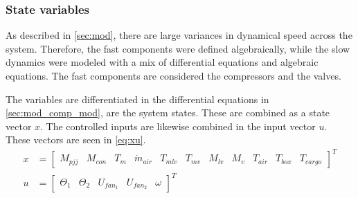 \newpage

\subsubsection{State variables}
As described in \cref{sec:mod}, there are large variances in dynamical speed across the system. Therefore, the fast components were defined algebraically, while the slow dynamics were modeled with a mix of differential equations and algebraic equations. The fast components are considered the compressors and the valves.

The variables are differentiated in the differential equations in \cref{sec:mod_comp_mod}, are the system states. These are combined as a state vector $x$. The controlled inputs are likewise combined in the input vector $u$. These vectors are seen in \cref{eq:xu}.
\begin{equation}  \label{eq:xu}
	\begin{split}
		x &= \begin{bmatrix}
			M_{pjj}				&		%
			M_{con} 			&		%
			T_m 				&		%
			\dot{m}_{air}		&		%
			T_{mlv}				&		%
			T_{mv}				&		%
			M_{lv}				&		%
			M_v					&		%
			T_{air}				&		%
			T_{box}				&		%
			T_{cargo}					%
		\end{bmatrix}^T \\
		u &= \begin{bmatrix}
			\Theta_1			&			%
			\Theta_2 			&			%
			U_{fan_1}			&			%
			U_{fan_2}			&			%
			\omega							%
		\end{bmatrix}^T
	\end{split}
\end{equation}


